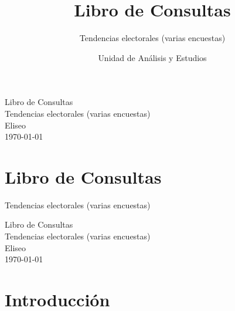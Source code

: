 \documentclass[
  letterpaper,
  DIV=11,
  numbers=noendperiod]{scrreprt}
\title{Libro de Consultas}
\subtitle{Tendencias electorales (varias encuestas)}
\author{Unidad de Análisis y Estudios}
\date{}
\renewcommand*\contentsname{Table of contents}
\newcommand\contentsname{Table of contents}
\begin{document}
\maketitle

\thispagestyle{empty}
\pagecolor{coverblue}
\color{coverwhite}

\vspace*{\fill}
\begin{center}
{\robotoMedium\fontsize{36}{42}\selectfont Libro de Consultas}\\[1.5em]
{\robotoRegular\fontsize{22}{28}\selectfont Tendencias electorales (varias encuestas)}\\[2em]
{\robotoLight\fontsize{18}{24}\selectfont Eliseo}\\[2em]
\today
\end{center}
\vspace*{\fill}

\pagecolor{white}
\clearpage

\renewcommand*\contentsname{Table of contents}
{
\hypersetup{linkcolor=}
\setcounter{tocdepth}{2}
\tableofcontents
}


\chapter{Libro de Consultas}\label{libro-de-consultas}

Tendencias electorales (varias encuestas)

\hfill\break

\thispagestyle{empty}
\pagecolor{coverblue}
\color{coverwhite}

\vspace*{\fill}
\begin{center}
{\robotoMedium\fontsize{36}{42}\selectfont Libro de Consultas}\\[1.5em]
{\robotoRegular\fontsize{22}{28}\selectfont Tendencias electorales (varias encuestas)}\\[2em]
{\robotoLight\fontsize{18}{24}\selectfont Eliseo}\\[2em]
\today
\end{center}
\vspace*{\fill}

\pagecolor{white}
\clearpage


\chapter{Introducción}\label{introducciuxf3n}
\end{document}
